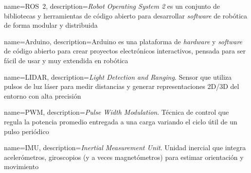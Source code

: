 {
name=ROS~2,
description={\textit{Robot Operating System 2} es un conjunto de bibliotecas y herramientas de código abierto para desarrollar \textit{software} de robótica de forma modular y distribuida}
}

{
name=Arduino,
description={Arduino es una plataforma de \textit{hardware} y \textit{software} de código abierto para crear proyectos electrónicos interactivos, pensada para ser fácil de usar y muy extendida en robótica}
}

{
name=LIDAR,
description={\textit{Light Detection and Ranging}. Sensor que utiliza pulsos de luz láser para medir distancias y generar representaciones 2D/3D del entorno con alta precisión}
}

{
name=PWM,
description={\textit{Pulse Width Modulation}. Técnica de control que regula la potencia promedio entregada a una carga variando el ciclo útil de un pulso periódico}
}

{
name=IMU,
description={\textit{Inertial Measurement Unit}. Unidad inercial que integra acelerómetros, giroscopios (y a veces magnetómetros) para estimar orientación y movimiento}
}
